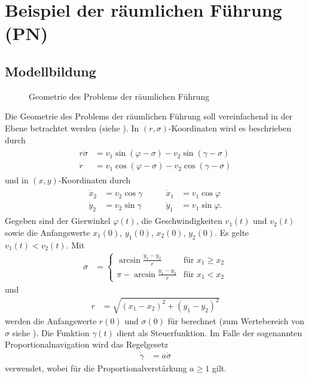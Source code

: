 \section{Beispiel der räumlichen Führung (\ac{PN})}
\subsection{Modellbildung}
\begin{figure}[htb]
	\centering
	
	\caption{Geometrie des Problems der räumlichen Führung}
	\label{fig:kap_3_bsp_rf_geometrie}
\end{figure}
Die Geometrie des Problems der räumlichen Führung  soll vereinfachend in der Ebene betrachtet werden (siehe ). In $(r,\sigma)$-Koordinaten wird es
beschrieben durch
\begin{align}
	\begin{split}\label{eqn:kap_3_bsp_rf_rskoord}
		r\dot{\sigma} & = v_1\sin(\varphi - \sigma) - v_2\sin(\gamma - \sigma)\\
		\dot{r} & = v_1\cos(\varphi - \sigma) - v_2\cos(\gamma - \sigma)
	\end{split}
\end{align}
und in $(x,y)$-Koordinaten durch
\begin{align}
	\begin{aligned}\label{eqn:kap_3_bsp_rf_xykoord}
		\dot{x}_2 & = v_2 \cos \gamma  & \qquad \dot{x}_1 & = v_1 \cos \varphi\\
		\dot{y}_2 & = v_2 \sin \gamma  & \qquad \dot{y}_1 & = v_1 \sin \varphi.
	\end{aligned}
\end{align}
Gegeben sind der Gierwinkel $\varphi(t)$, die Geschwindigkeiten $v_1(t)$ und $v_2(t)$ sowie die Anfangswerte $x_1(0)$, $y_1(0)$, $x_2(0)$, $y_2(0)$. Es gelte $v_1(t) < v_2(t)$. Mit
\begin{align}\label{eqn:kap_3_bsp_rf_sigma}
\sigma & = \left\{ \begin{array}{rl}
	\arcsin\frac{y_1-y_2}{r}	& \text{für } x_1\geq x_2\\
	\pi-\arcsin\frac{y_1-y_2}{r} & \text{für } x_1 < x_2
\end{array} \right.
\end{align}
und
\begin{align}
	r & = \sqrt{ (x_1 - x_2)^2 + (y_1 - y_2)^2 } \label{eqn:kap_3_bsp_rf_regelgesetz}
\end{align}
werden die Anfangswerte $r(0)$ und $\sigma(0)$ für  berechnet (zum Wertebereich von $\sigma$ siehe ). Die Funktion
$\gamma(t)$ dient als Steuerfunktion. Im Falle der sogenannten Proportionalnavigation wird das Regelgesetz
\begin{align}
	\dot{\gamma} & = a \dot{\sigma}	\label{eqn:kap_3_bsp_rf_regelgesetz}
\end{align}
verwendet, wobei für die Proportionalverstärkung $a\geq 1$ gilt.

